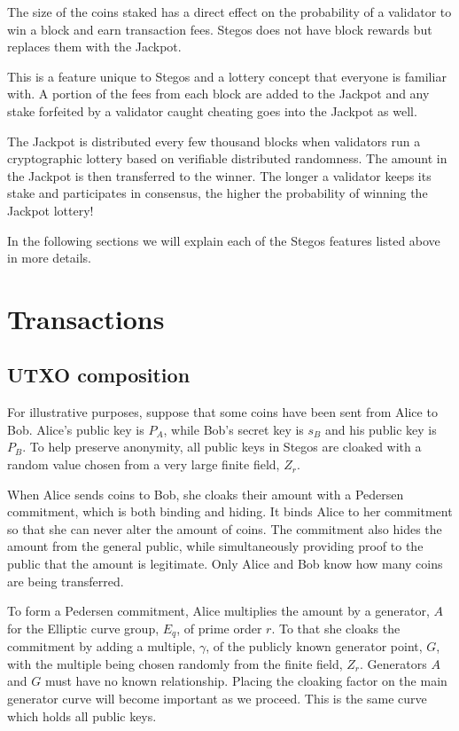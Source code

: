 \documentclass[a4paper, 10pt, conference]{ieeeconf}
\begin{document}
The size of the coins staked has a direct effect on the probability of a validator to win a block and earn transaction fees. Stegos does not have block rewards but replaces them with the Jackpot.

This is a feature unique to Stegos and a lottery concept that everyone is familiar with. A portion of the fees from each block are added to the Jackpot and any stake forfeited by a validator caught cheating goes into the Jackpot as well.

The Jackpot is distributed every few thousand blocks when validators run a cryptographic lottery based on verifiable distributed randomness. The amount in the Jackpot is then transferred to the winner. The longer a validator keeps its stake and participates in consensus, the higher the probability of winning the Jackpot lottery!

In the following sections we will explain each of the Stegos features listed above in more details.

\section{Transactions}

\subsection{UTXO composition}

For illustrative purposes, suppose that some coins have been sent from Alice to Bob. Alice's public key is $P_A$, while Bob's secret key is $s_B$ and his public key is $P_B$. To help preserve anonymity, all public keys in Stegos are cloaked with a random value chosen from a very large finite field, $Z_r$.

When Alice sends coins to Bob, she cloaks their amount with a Pedersen commitment, which is both binding and hiding. It binds Alice to her commitment so that she can never alter the amount of coins. The commitment also hides the amount from the general public, while simultaneously providing proof to the public that the amount is legitimate.  Only Alice and Bob know how many coins are being transferred. 

To form a Pedersen commitment, Alice multiplies the amount by a generator, $A$ for the Elliptic curve group, $E_q$, of prime order $r$. To that she cloaks the commitment by adding a multiple, $\gamma$, of the publicly known generator point, $G$, with the multiple being chosen randomly from the finite field, $Z_r$. Generators $A$ and $G$ must have no known relationship. Placing the cloaking factor on the main generator curve will become important as we proceed. This is the same curve which holds all public keys. 
\end{document}
